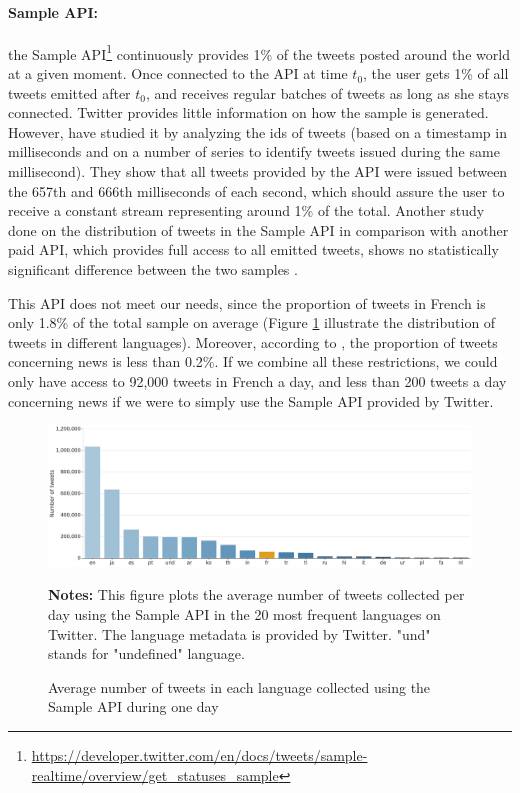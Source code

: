 	


\paragraph{Sample API:}

the Sample API\footnote{\url{https://developer.twitter.com/en/docs/tweets/sample-realtime/overview/get_statuses_sample}} continuously provides 1\% of the tweets posted around the world at a given moment. Once connected to the API at time $t_0$, the user gets 1\% of all tweets emitted after $t_0$, and receives regular batches of tweets as long as she stays connected. Twitter provides little information on how the sample is generated. However,  \citet{kergl_endogenesis_2014} have studied it by analyzing the ids of tweets (based on a timestamp in milliseconds and on a number of series to identify tweets issued during the same millisecond). They show that all tweets provided by the API were issued between the 657th and 666th milliseconds of each second, which should assure the user to receive a constant stream representing around 1\% of the total. Another study done on the distribution of tweets in the Sample API in comparison with another paid API, which provides full access to all emitted tweets, shows no statistically significant difference between the two samples \citep{morstatter_when_2014}.


This API does not meet our needs, since the proportion of tweets in French is only 1.8\% of the total sample on average (Figure \ref{Figure:HistogramLanguages} illustrate the distribution of tweets in different languages). Moreover, according to \citet{liu_reuters_2016}, the proportion of tweets concerning news is less than 0.2\%. If we combine all these restrictions, we could only have access to 92,000 tweets in French a day, and less than 200 tweets a day concerning news if we were to simply use the Sample API provided by Twitter.

\begin{figure}
\begin{center}
\includegraphics[width=1\textwidth]{figures/HistogramLanguages.pdf}
\end{center}
{\scriptsize \textbf{Notes:} This figure plots the average number of tweets collected  per day using the Sample API in the 20 most frequent languages on Twitter. The language metadata is provided by Twitter. "und" stands for "undefined" language.}
\caption{Average number of tweets in each language collected using the Sample API during one day}
\label{Figure:HistogramLanguages}
\end{figure}


